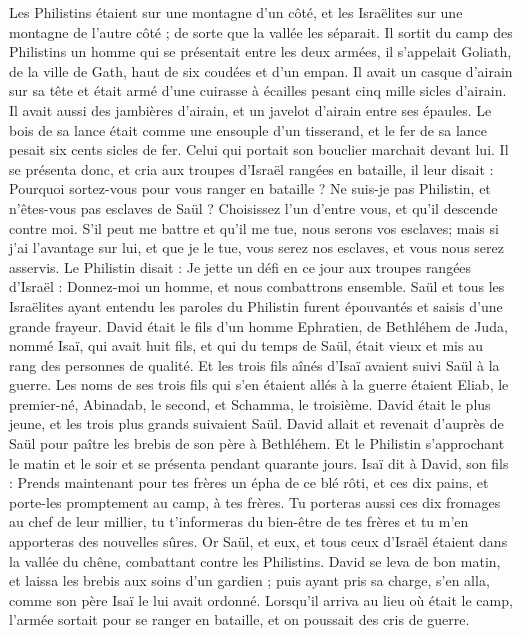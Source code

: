 \begin{multicols}{2}
Les Philistins étaient sur une montagne d'un côté, et les Israëlites sur une montagne de l'autre côté ; de sorte que la vallée les séparait.
Il sortit du camp des Philistins un homme qui se présentait entre les deux armées, il s'appelait Goliath, de la ville de Gath, haut de six coudées et d'un empan.
Il avait un casque d'airain sur sa tête et était armé d'une cuirasse à écailles pesant cinq mille sicles d'airain.
Il avait aussi des jambières d'airain, et un javelot d'airain entre ses épaules.
Le bois de sa lance était comme une ensouple d'un tisserand, et le fer de sa lance pesait six cents sicles de fer. Celui qui portait son bouclier marchait devant lui.
Il se présenta donc, et cria aux troupes d'Israël rangées en bataille, il leur disait : Pourquoi sortez-vous pour vous ranger en bataille ? Ne suis-je pas Philistin, et n'êtes-vous pas esclaves de Saül ? Choisissez l'un d'entre vous, et qu'il descende contre moi.
S'il peut me battre et qu'il me tue, nous serons vos esclaves; mais si j'ai l'avantage sur lui, et que je le tue, vous serez nos esclaves, et vous nous serez asservis.
Le Philistin disait : Je jette un défi en ce jour aux troupes rangées d'Israël : Donnez-moi un homme, et nous combattrons ensemble.
Saül et tous les Israëlites ayant entendu les paroles du Philistin furent épouvantés et saisis d'une grande frayeur.
David était le fils d'un homme Ephratien, de Bethléhem de Juda, nommé Isaï, qui avait huit fils, et qui du temps de Saül, était vieux et mis au rang des personnes de qualité.
Et les trois fils aînés d'Isaï avaient suivi Saül à la guerre. Les noms de ses trois fils qui s'en étaient allés à la guerre étaient Eliab, le premier-né, Abinadab, le second, et Schamma, le troisième.
David était le plus jeune, et les trois plus grands suivaient Saül.
David allait et revenait d'auprès de Saül pour paître les brebis de son père à Bethléhem.
Et le Philistin s'approchant le matin et le soir et se présenta pendant quarante jours.
Isaï dit à David, son fils : Prends maintenant pour tes frères un épha de ce blé rôti, et ces dix pains, et porte-les promptement au camp, à tes frères.
Tu porteras aussi ces dix fromages au chef de leur millier, tu t'informeras du bien-être de tes frères et tu m'en apporteras des nouvelles sûres.
Or Saül, et eux, et tous ceux d'Israël étaient dans la vallée du chêne, combattant contre les Philistins.
David se leva de bon matin, et laissa les brebis aux soins d'un gardien ; puis ayant pris sa charge, s'en alla, comme son père Isaï le lui avait ordonné. Lorsqu'il arriva au lieu où était le camp, l'armée sortait pour se ranger en bataille, et on poussait des cris de guerre.

\end{multicols}
